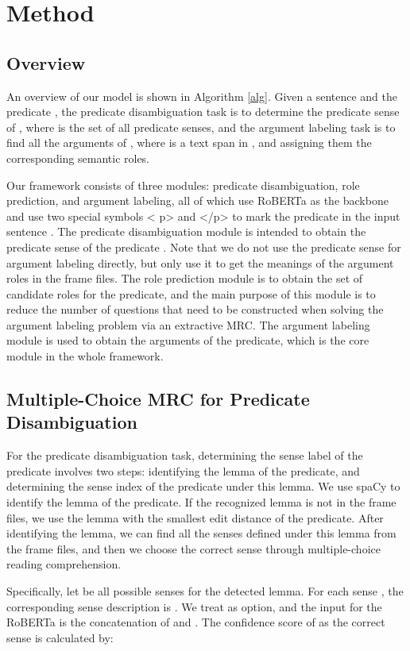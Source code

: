 \documentclass[11pt]{article}
\begin{document}
\section{Method}
\subsection{Overview}
An overview of our model is shown in Algorithm \ref{alg}. Given a sentence  and the predicate , the predicate disambiguation task is to determine the predicate sense  of , where  is the set of all predicate senses, and the argument labeling task is to find all the arguments  of , where  is a text span in , and assigning them the corresponding semantic roles.
\par
Our framework consists of three modules: predicate disambiguation, role prediction, and argument labeling, all of which use RoBERTa \cite{liu2019roberta}  as the backbone and use two special symbols
\textless{} p\textgreater{} and \textless{}/p\textgreater{} 
to mark the predicate  in the input sentence .
The predicate disambiguation module is intended to obtain the predicate sense of the predicate . Note that we do not use the predicate sense for argument labeling directly, but only use it to get the meanings of the argument roles in the frame files.
The role prediction module is to obtain the set of candidate roles for the predicate, and the main purpose of this module is to reduce the number of questions that need to be constructed when solving the argument labeling problem via an extractive MRC.
The argument labeling module is used to obtain the arguments of the predicate, which is the core module in the whole framework.

\subsection{Multiple-Choice MRC for Predicate Disambiguation}
For the predicate disambiguation task, determining the sense label of the predicate involves two steps: identifying the lemma of the predicate, and determining the sense index of the predicate under this lemma. We use spaCy \cite{spacy} to identify the lemma of the predicate. If the recognized lemma is not in the frame files, we use the lemma with the smallest edit distance of the predicate. After identifying the lemma, we can find all the senses defined under this lemma from the frame files, and then we choose the correct sense through multiple-choice reading comprehension.
\par
Specifically, let  be all possible senses for the detected lemma. For each sense , the corresponding sense description is . We treat  as option, and the input for the RoBERTa is the concatenation of  and . The confidence score of  as the correct sense is calculated by:
\end{document}
